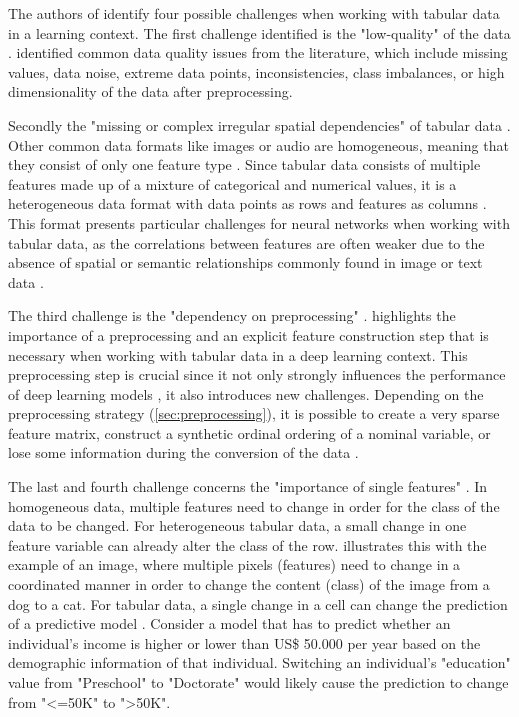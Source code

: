The authors of \cite{borisov2022DeepNeuralNetworks} identify four possible challenges when working with tabular data in a learning context.
The first challenge identified is the "low-quality" of the data \cite[p. 4]{borisov2022DeepNeuralNetworks}. 
\textcite{borisov2022DeepNeuralNetworks} identified common data quality issues from the literature, which include missing values, data noise, extreme data points, inconsistencies, class imbalances, or high dimensionality of the data after preprocessing.

Secondly the "missing or complex irregular spatial dependencies" of tabular data \cite[p. 4]{borisov2022DeepNeuralNetworks}. 
Other common data formats like images or audio are homogeneous, meaning that they consist of only one feature type \cite{borisov2022DeepNeuralNetworks}.
Since tabular data consists of multiple features made up of a mixture of categorical and numerical values, it is a heterogeneous data format with data points as rows and features as columns \cite{borisov2022DeepNeuralNetworks}.
This format presents particular challenges for neural networks when working with tabular data, as the correlations between features are often weaker due to the absence of spatial or semantic relationships commonly found in image or text data \cite{borisov2022DeepNeuralNetworks, yoon2020VIMEExtendingSuccess}.

The third challenge is the "dependency on preprocessing" \cite[p. 4]{borisov2022DeepNeuralNetworks}. 
\cite{borisov2022DeepNeuralNetworks} highlights the importance of a preprocessing and an explicit feature construction step that is necessary when working with tabular data in a deep learning context.
This preprocessing step is crucial since it not only strongly influences the performance of deep learning models \cite{gorishniy2022EmbeddingsNumericalFeatures}, it also introduces new challenges. 
Depending on the preprocessing strategy (\autoref{sec:preprocessing}), it is possible to create a very sparse feature matrix, construct a synthetic ordinal ordering of a nominal variable, or lose some information during the conversion of the data \cite{borisov2022DeepNeuralNetworks}.

The last and fourth challenge concerns the "importance of single features" \cite[p. 4]{borisov2022DeepNeuralNetworks}. 
In homogeneous data, multiple features need to change in order for the class of the data to be changed. 
For heterogeneous tabular data, a small change in one feature variable can already alter the class of the row. 
\cite{borisov2022DeepNeuralNetworks} illustrates this with the example of an image, where multiple pixels (\ie features) need to change in a coordinated manner in order to change the content (\ie class) of the image from a dog to a cat.
For tabular data, a single change in a cell can change the prediction of a predictive model \cite{borisov2022DeepNeuralNetworks}. 
Consider a model that has to predict whether an individual's income is higher or lower than US\$ 50.000 per year \cite{Dua:2019} based on the demographic information of that individual.
Switching an individual's "education" value from "Preschool" to "Doctorate" would likely cause the prediction to change from "<=50K" to ">50K".


